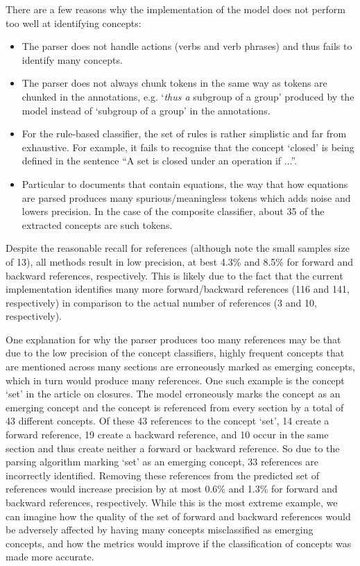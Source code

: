 \documentclass[12pt]{article}
\theoremstyle{grammarstyle}
\begin{document}
There are a few reasons why the implementation of the model does not perform too well at identifying concepts:
\begin{itemize}
    \item The parser does not handle actions (verbs and verb phrases) and thus fails to identify many concepts.
    \item The parser does not always chunk tokens in the same way as tokens are chunked in the annotations, e.g. `\textit{thus a} subgroup of a group' produced by the model instead of `subgroup of a group' in the annotations.
    \item For the rule-based classifier, the set of rules is rather simplistic and far from exhaustive.
    For example, it fails to recognise that the concept `closed' is being defined in the sentence ``A set is closed under an operation if ...''.

    \item Particular to documents that contain equations, the way that how equations are parsed produces many spurious/meaningless tokens which adds noise and lowers precision. In the case of the composite classifier, about 35 of the extracted concepts are such tokens.
\end{itemize}

Despite the reasonable recall for references (although note the small samples size of 13), all methods result in low precision, at best 4.3\% and 8.5\% for forward and backward references, respectively. This is likely due to the fact that the current implementation identifies many more forward/backward references (116 and 141, respectively) in comparison to the actual number of references (3 and 10, respectively).

One explanation for why the parser produces too many references may be that due to the low precision of the concept classifiers, highly frequent concepts that are mentioned across many sections are erroneously marked as emerging concepts, which in turn would produce many references. One such example is the concept `set' in the article on closures. The model erroneously marks the concept as an emerging concept and the concept is referenced from every section by a total of 43 different concepts. Of these 43 references to the concept `set', 14 create a forward reference, 19 create a backward reference, and 10 occur in the same section and thus create neither a forward or backward reference.
So due to the parsing algorithm marking `set' as an emerging concept, 33 references are incorrectly identified.
Removing these references from the predicted set of references would increase precision by at most 0.6\% and 1.3\% for forward and backward references, respectively.
While this is the most extreme example, we can imagine how the quality of the set of forward and backward references would be adversely affected by having many concepts misclassified as emerging concepts, and how the metrics would improve if the classification of concepts was made more accurate.
\end{document}
